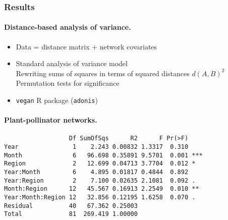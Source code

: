 \documentclass[8pt]{beamer}
\begin{document}
\begin{frame}[fragile] \frametitle{Results}

  \paragraph{Distance-based analysis of variance.} 
  \begin{itemize}
    \item Data = distance matrix + network covariates
    \item Standard analysis of variance model \\  
    \ra Rewriting sums of squares in terms of squared distances $d(A, B)^2$ \\
    \ra Permutation tests for significance
    \item {\tt vegan} R package ({\tt adonis})
  \end{itemize}
  
  \bigskip \pause
  \paragraph{Plant-pollinator networks.}   
\begin{verbatim}
                  Df SumOfSqs      R2      F Pr(>F)    
Year               1    2.243 0.00832 1.3317  0.310    
Month              6   96.698 0.35891 9.5701  0.001 ***
Region             2   12.699 0.04713 3.7704  0.012 *  
Year:Month         6    4.895 0.01817 0.4844  0.892    
Year:Region        2    7.100 0.02635 2.1081  0.092 .  
Month:Region      12   45.567 0.16913 2.2549  0.010 ** 
Year:Month:Region 12   32.856 0.12195 1.6258  0.070 .  
Residual          40   67.362 0.25003                  
Total             81  269.419 1.00000                  
\end{verbatim}
  
\end{frame}
\end{document}
